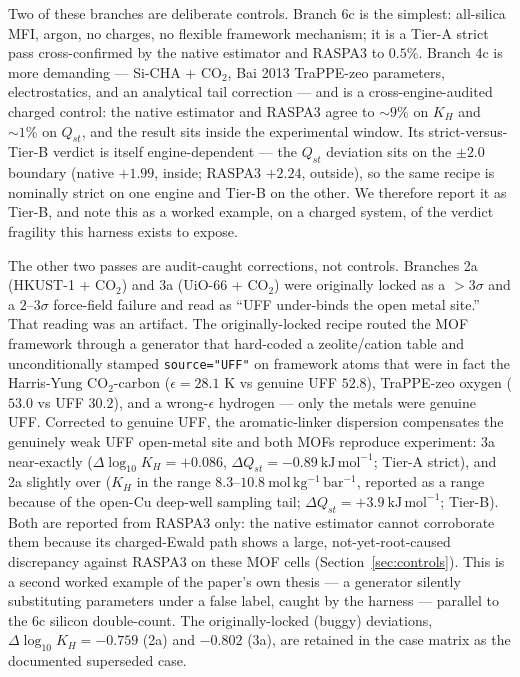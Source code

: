Two of these branches are deliberate controls. Branch 6c is the simplest: all-silica MFI, argon, no charges, no flexible framework mechanism; it is a Tier-A strict pass cross-confirmed by the native estimator and RASPA3 to \(0.5\%\). Branch 4c is more demanding --- Si-CHA + CO\(_2\), Bai 2013 TraPPE-zeo parameters, electrostatics, and an analytical tail correction --- and is a cross-engine-audited charged control: the native estimator and RASPA3 agree to \(\sim\!9\%\) on \(K_H\) and \(\sim\!1\%\) on \(Q_{st}\), and the result sits inside the experimental window. Its strict-versus-Tier-B verdict is itself engine-dependent --- the \(Q_{st}\) deviation sits on the \(\pm2.0\) boundary (native \(+1.99\), inside; RASPA3 \(+2.24\), outside), so the same recipe is nominally strict on one engine and Tier-B on the other. We therefore report it as Tier-B, and note this as a worked example, on a charged system, of the verdict fragility this harness exists to expose.

The other two passes are audit-caught corrections, not controls. Branches 2a (HKUST-1 + CO\(_2\)) and 3a (UiO-66 + CO\(_2\)) were originally locked as a \(>3\sigma\) and a \(2\)--\(3\sigma\) force-field failure and read as ``UFF under-binds the open metal site.'' That reading was an artifact. The originally-locked recipe routed the MOF framework through a generator that hard-coded a zeolite/cation table and unconditionally stamped \texttt{source="UFF"} on framework atoms that were in fact the Harris-Yung CO\(_2\)-carbon (\(\epsilon = 28.1\) K vs genuine UFF \(52.8\)), TraPPE-zeo oxygen (\(53.0\) vs UFF \(30.2\)), and a wrong-\(\epsilon\) hydrogen --- only the metals were genuine UFF. Corrected to genuine UFF, the aromatic-linker dispersion compensates the genuinely weak UFF open-metal site and both MOFs reproduce experiment: 3a near-exactly (\(\Delta\log_{10}K_H = +0.086\), \(\Delta Q_{st} = -0.89\ \mathrm{kJ\,mol^{-1}}\); Tier-A strict), and 2a slightly over (\(K_H\) in the range \(8.3\)--\(10.8\ \mathrm{mol\,kg^{-1}\,bar^{-1}}\), reported as a range because of the open-Cu deep-well sampling tail; \(\Delta Q_{st} = +3.9\ \mathrm{kJ\,mol^{-1}}\); Tier-B). Both are reported from RASPA3 only: the native estimator cannot corroborate them because its charged-Ewald path shows a large, not-yet-root-caused discrepancy against RASPA3 on these MOF cells (Section~\ref{sec:controls}). This is a second worked example of the paper's own thesis --- a generator silently substituting parameters under a false label, caught by the harness --- parallel to the 6c silicon double-count. The originally-locked (buggy) deviations, \(\Delta\log_{10}K_H = -0.759\) (2a) and \(-0.802\) (3a), are retained in the case matrix as the documented superseded case.

